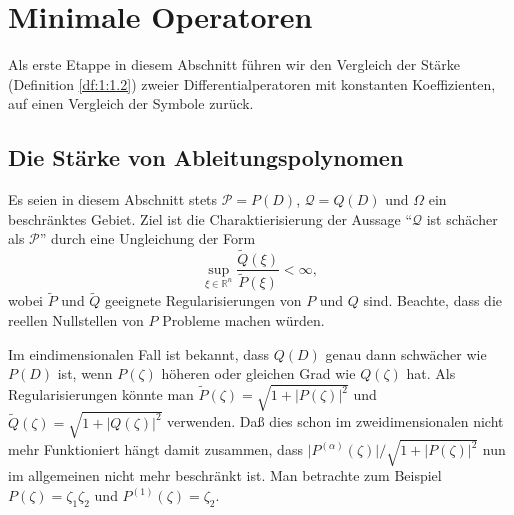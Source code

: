 \chapter{Minimale Operatoren}

\def\N{\mathbb N}
\def\R{\mathbb R}
\def\C{\mathbb C}
\def\mcP{\mathcal P}
\def\mcQ{\mathcal Q}
\def\mcR{\mathcal R}
\def\pr{\prime}
\def\tr{\mathrm{T}}
\def\al{\alpha}
\def\be{\beta}
\def\de{\delta}
\def\ep{\epsilon}
\def\ga{\gamma}
\def\x{\xi}
\def\y{\eta}
\def\z{\zeta}
\def\Om{\Omega}
\def\infi{\infty}
\def\d{\partial}
\def\df{\mathrm{d}}
\def\til#1{\widetilde{#1}}
\def\mto{\mapsto}
\def\ti{\times}
\def\abs#1{\lvert#1\rvert}
\def\norm#1{\lVert#1\rVert}
\def\Lap{\Delta}
\def\cc#1{\overline{#1}}
\def\ul#1{\underline{#1}}
\def\ska#1#2{\langle#1,#2\rangle}
\def\Ska#1#2{\left\langle#1,#2\right\rangle}
\def\div{\operatorname{div}}
\def\diam{\operatorname{diam}}

Als erste Etappe in diesem Abschnitt führen wir den Vergleich der Stärke (Definition \ref{df:1:1.2})
zweier Differentialperatoren mit konstanten Koeffizienten,
auf einen Vergleich der Symbole zurück.

\section{Die Stärke von Ableitungspolynomen}

Es seien in diesem Abschnitt stets $\mcP=P(D)$, $\mcQ=Q(D)$ und $\Om$ ein beschränktes Gebiet.
Ziel ist die Charaktierisierung der Aussage ``$\mathcal Q$ ist schächer als $\mcP$''
durch eine Ungleichung der Form
\begin{equation}\label{eq:2:1}
\sup_{\x\in\R^n}\frac{\til{Q}(\x)}{\til{P}(\x)}<\infi,
\end{equation}
wobei $\til{P}$ und $\til{Q}$ geeignete Regularisierungen von $P$ und $Q$ sind.
Beachte, dass die reellen Nullstellen von $P$ Probleme machen würden.

Im eindimensionalen Fall ist bekannt, dass $Q(D)$ genau dann schwächer wie $P(D)$ ist,
wenn $P(\z)$ höheren oder gleichen Grad wie $Q(\z)$ hat.
Als Regularisierungen könnte man $\til{P}(\z)=\sqrt{1+\abs{P(\z)}^2}$
und $\til{Q}(\z)=\sqrt{1+\abs{Q(\z)}^2}$ verwenden.
Daß dies schon im zweidimensionalen nicht mehr Funktioniert
hängt damit zusammen, dass $\abs{P^{(\al)}(\z)}/\sqrt{1+\abs{P(\z)}^2}$
nun im allgemeinen nicht mehr beschränkt ist.
Man betrachte zum Beispiel $P(\z)=\z_1\z_2$ und $P^{(1)}(\z)=\z_2$.

